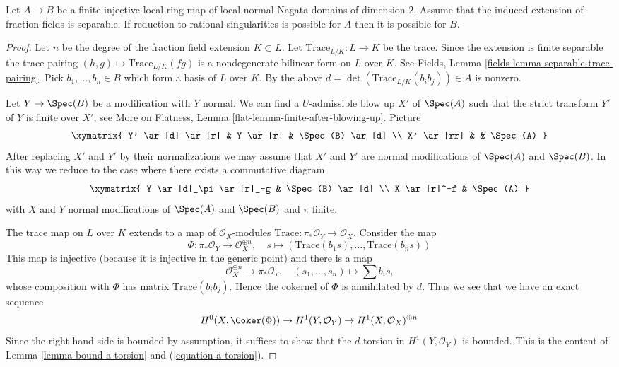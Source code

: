 \begin{lemma}
\label{lemma-go-up-separable}
Let $A \to B$ be a finite injective local ring map of local normal
Nagata domains of dimension $2$. Assume that the induced extension of
fraction fields is separable. If reduction to rational singularities
is possible for $A$ then it is possible for $B$.
\end{lemma}

\begin{proof}
Let $n$ be the degree of the fraction field extension $K \subset L$.
Let $\text{Trace}_{L/K} : L \to K$ be the trace. Since the extension is finite
separable the trace pairing $(h, g) \mapsto \text{Trace}_{L/K}(fg)$
is a nondegenerate bilinear form on $L$ over $K$. See
Fields, Lemma \ref{fields-lemma-separable-trace-pairing}.
Pick $b_1, \ldots, b_n \in B$ which form a basis of $L$ over $K$.
By the above $d = \det(\text{Trace}_{L/K}(b_ib_j)) \in A$ is nonzero.

\medskip\noindent
Let $Y \to \Spec(B)$ be a modification with $Y$ normal. We can find
a $U$-admissible blow up $X'$ of $\Spec(A)$ such that the strict transform
$Y'$ of $Y$ is finite over $X'$, see More on Flatness, Lemma
\ref{flat-lemma-finite-after-blowing-up}. Picture
$$
\xymatrix{
Y' \ar[d] \ar[r] & Y \ar[r] & \Spec(B) \ar[d] \\
X' \ar[rr] & & \Spec(A)
}
$$
After replacing $X'$ and $Y'$ by their normalizations we may assume that
$X'$ and $Y'$ are normal modifications of $\Spec(A)$ and $\Spec(B)$.
In this way we reduce to the case where there exists a commutative diagram
$$
\xymatrix{
Y \ar[d]_\pi \ar[r]_-g & \Spec(B) \ar[d] \\
X \ar[r]^-f & \Spec(A)
}
$$
with $X$ and $Y$ normal modifications of $\Spec(A)$ and $\Spec(B)$ and
$\pi$ finite.

\medskip\noindent
The trace map on $L$ over $K$ extends to a map of $\mathcal{O}_X$-modules
$\text{Trace} : \pi_*\mathcal{O}_Y \to \mathcal{O}_X$. Consider the map
$$
\Phi : \pi_*\mathcal{O}_Y \longrightarrow \mathcal{O}_X^{\oplus n},\quad
s \longmapsto (\text{Trace}(b_1s), \ldots, \text{Trace}(b_ns))
$$
This map is injective (because it is injective in the generic point)
and there is a map
$$
\mathcal{O}_X^{\oplus n} \longrightarrow \pi_*\mathcal{O}_Y,\quad
(s_1, \ldots, s_n) \longmapsto \sum b_i s_i
$$
whose composition with $\Phi$ has matrix $\text{Trace}(b_ib_j)$.
Hence the cokernel of $\Phi$ is annihilated by $d$. Thus we see that
we have an exact sequence
$$
H^0(X, \Coker(\Phi)) \to H^1(Y, \mathcal{O}_Y) \to
H^1(X, \mathcal{O}_X)^{\oplus n}
$$
Since the right hand side is bounded by assumption, it suffices to show
that the $d$-torsion in $H^1(Y, \mathcal{O}_Y)$ is bounded.
This is the content of Lemma \ref{lemma-bound-a-torsion} and
(\ref{equation-a-torsion}).
\end{proof}


